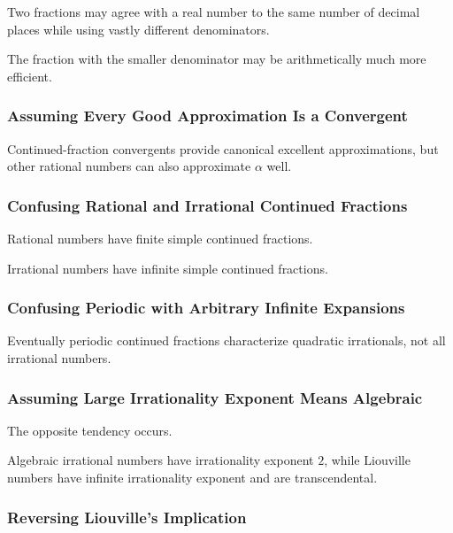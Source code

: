 Two fractions may agree with a real number to the same number of decimal
places while using vastly different denominators.

The fraction with the smaller denominator may be arithmetically much more
efficient.

\subsubsection{Assuming Every Good Approximation Is a Convergent}

Continued-fraction convergents provide canonical excellent approximations,
but other rational numbers can also approximate \(\alpha\) well.

\subsubsection{Confusing Rational and Irrational Continued Fractions}

Rational numbers have finite simple continued fractions.

Irrational numbers have infinite simple continued fractions.

\subsubsection{Confusing Periodic with Arbitrary Infinite Expansions}

Eventually periodic continued fractions characterize quadratic irrationals,
not all irrational numbers.

\subsubsection{Assuming Large Irrationality Exponent Means Algebraic}

The opposite tendency occurs.

Algebraic irrational numbers have irrationality exponent \(2\), while
Liouville numbers have infinite irrationality exponent and are
transcendental.

\subsubsection{Reversing Liouville's Implication}

